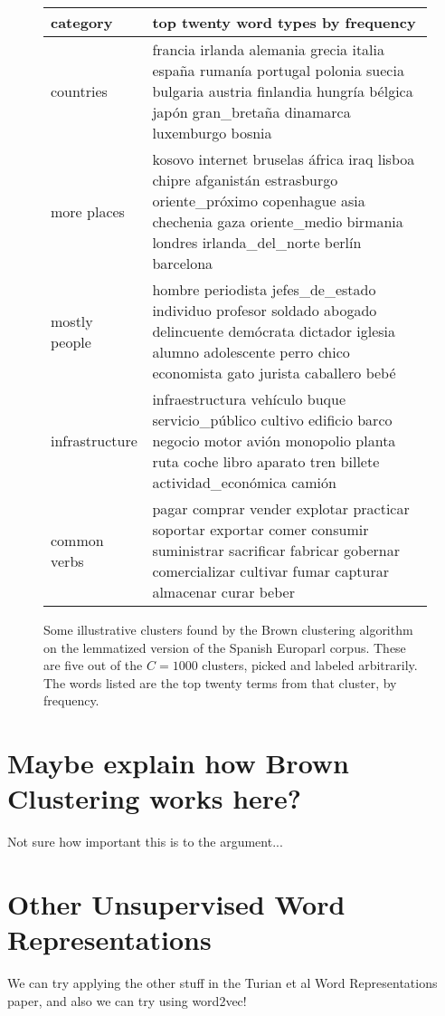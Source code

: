 \begin{figure*}[t!]
  \begin{tabular}{|l|p{12cm}|}
    \hline
    category  & top twenty word types by frequency \\
    \hline
    countries & francia irlanda alemania grecia italia españa rumanía portugal polonia suecia bulgaria austria finlandia hungría bélgica japón gran\_bretaña dinamarca luxemburgo bosnia \\
    \hline
    more places & kosovo internet bruselas áfrica iraq lisboa chipre afganistán estrasburgo oriente\_próximo copenhague asia chechenia gaza oriente\_medio birmania londres irlanda\_del\_norte berlín barcelona \\
    \hline
    mostly people & hombre periodista jefes\_de\_estado individuo profesor soldado abogado delincuente demócrata dictador iglesia alumno adolescente perro chico economista gato jurista caballero bebé \\
    \hline
    infrastructure & infraestructura vehículo buque servicio\_público cultivo edificio barco negocio motor avión monopolio planta ruta coche libro aparato tren billete actividad\_económica camión \\
    \hline
    common verbs & pagar comprar vender explotar practicar soportar exportar comer consumir suministrar sacrificar fabricar gobernar comercializar cultivar fumar capturar almacenar curar beber \\
    \hline
  \end{tabular}
\caption{Some illustrative clusters found by the Brown clustering algorithm on
the lemmatized version of the Spanish Europarl corpus. These are five out of
the $C=1000$ clusters, picked and labeled arbitrarily. The
words listed are the top twenty terms from that cluster, by frequency.}
\label{fig:clusters}
\end{figure*}

\section{Maybe explain how Brown Clustering works here?}
Not sure how important this is to the argument...

\section{Other Unsupervised Word Representations}
We can try applying the other stuff in the Turian et al Word Representations
paper, and also we can try using word2vec!
